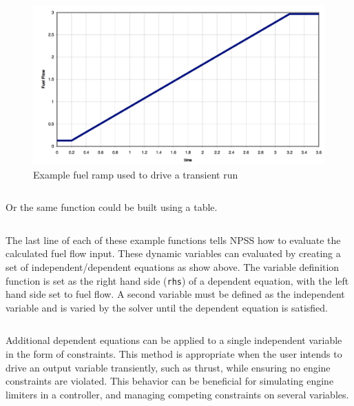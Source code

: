 \documentclass[heading.tex]{subfiles}
\begin{document}
\begin{figure}[H]
\centering
\includegraphics[width=1.0\textwidth]{images/fuelRamp}
\caption{Example fuel ramp used to drive a transient run}
\label{f:ramp}
\end{figure}

\begin{adjustwidth}{-1cm}{-1cm}
 \inputminted[]{c++}{code/rampFn}
 \end{adjustwidth} 
 
Or the same function could be built using a table. 
 
 \begin{adjustwidth}{-1cm}{-1cm}
 \inputminted[]{c++}{code/rampTb}
 \end{adjustwidth} 

The last line of each of these example functions tells NPSS how to evaluate the calculated fuel flow input.
These dynamic variables can evaluated by creating a set of independent/dependent equations as show above.
The variable definition function is set as the right hand side (\texttt{rhs}) of a dependent equation,
with the left hand side set to fuel flow. 
A second variable must be defined as the independent variable and is varied by the solver until the dependent equation is satisfied.

 \begin{adjustwidth}{1cm}{-1cm}
 \inputminted[]{c++}{code/solverSetup}
 \end{adjustwidth} 


Additional dependent equations can be applied to a single independent variable in the form of constraints.
This method is appropriate when the user intends to drive an output variable transiently,
such as thrust, while ensuring no engine constraints are violated.
This behavior can be beneficial for simulating engine limiters in a controller, and managing 
competing constraints on several variables.
 
\end{document}
